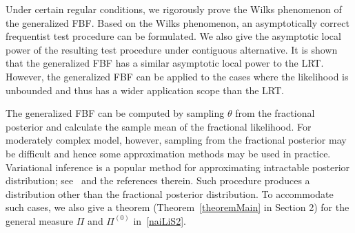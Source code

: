 \documentclass[11pt]{article}
\theoremstyle{plain}
\theoremstyle{definition}
\theoremstyle{remark}
\begin{document}
Under certain regular conditions, we rigorously prove the Wilks phenomenon of the generalized FBF.
Based on the Wilks phenomenon, an asymptotically correct frequentist test procedure can be formulated.
We also give the asymptotic local power of the resulting test procedure under contiguous alternative.
It is shown that the generalized FBF has a similar asymptotic local power to the LRT.
However, the generalized FBF
can be applied to the cases where the likelihood is unbounded
and thus has a wider application scope than the LRT.







The generalized FBF can be computed by sampling $\theta$ from the fractional posterior and calculate the sample mean of the fractional likelihood.
For moderately complex model, however, sampling from the fractional posterior may be difficult and hence some approximation methods may be used in practice.
Variational inference is a popular method for approximating intractable posterior distribution; see~\cite{blei2017} and the references therein.
Such procedure produces a distribution other than the fractional posterior distribution.
To accommodate such cases, we also give a theorem (Theorem~\ref{theoremMain} in Section 2) for the general measure $\Pi$ and $\Pi^{(0)}$ in~\eqref{naiLiS2}.
\end{document}
